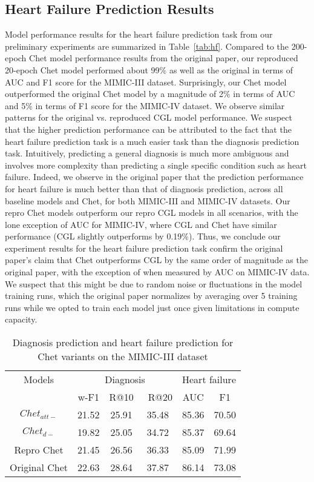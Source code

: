 \documentclass[11pt,a4paper,fleqn]{article}
\begin{document}
\subsection{Heart Failure Prediction Results}
Model performance results for the heart failure prediction task from our
preliminary experiments are summarized in Table~\ref{tab:hf}. Compared to the
200-epoch Chet model performance results from the original paper, our reproduced
20-epoch Chet model performed about 99\% as well as the original in terms of AUC
and F1 score for the MIMIC-III dataset. Surprisingly, our Chet model
outperformed the original Chet model by a magnitude of 2\% in terms of AUC and
5\% in terms of F1 score for the MIMIC-IV dataset. We observe similar patterns
for the original vs. reproduced CGL model performance. We suspect that the
higher prediction performance can be attributed to the fact that the heart
failure prediction task is a much easier task than the diagnosis prediction
task. Intuitively, predicting a general diagnosis is much more ambiguous and
involves more complexity than predicting a single specific condition such as
heart failure. Indeed, we observe in the original paper that the prediction
performance for heart failure is much better than that of diagnosis prediction,
across all baseline models and Chet, for both MIMIC-III and MIMIC-IV datasets.
Our repro Chet models outperform our repro CGL models in all scenarios, with the
lone exception of AUC for MIMIC-IV, where CGL and Chet have similar performance
(CGL slightly outperforms by 0.19\%). Thus, we conclude our experiment results
for the heart failure prediction task confirm the original paper's claim that
Chet outperforms CGL by the same order of magnitude as the original paper, with
the exception of when measured by AUC on MIMIC-IV data. We suspect that this
might be due to random noise or fluctuations in the model training runs, which
the original paper normalizes by averaging over 5 training runs while we opted to 
train each model just once given limitations in compute capacity.

\begin{table*}[ht]
  \centering
  \begin{tabular}{|c|c|c|c|c|c|}
  \hline
  {Models} & \multicolumn{3}{c|}{Diagnosis} & \multicolumn{2}{c|}{Heart failure} \\
   \cline{2-6} & w-F1 & R@10 & \ R@20 & AUC & F1  \\ \hline
  \cline{1-6}{$Chet_{att-}$} & 21.52 & 25.91 & 35.48 & 85.36 & 70.50 \\
  \cline{1-6} {$Chet_{d-}$} & 19.82 & 25.05 & 34.72 & 85.37 & 69.64 \\
  \cline{1-6} {Repro Chet} & 21.45 & 26.56 & 36.33 & 85.09 & 71.99  \\
  \cline{1-6} {Original Chet} & 22.63 & 28.64 & 37.87 & 86.14 & 73.08\\
  \cline{1-6}
  \end{tabular}
  \caption{Diagnosis prediction and heart failure prediction for Chet variants on the MIMIC-III dataset}
  \label{tab:ablation}
  \end{table*}
\end{document}
